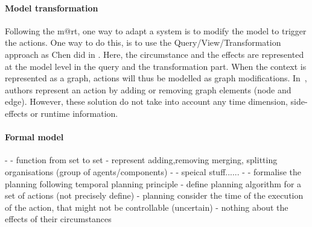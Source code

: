 	
\paragraph{Model transformation}
Following the \gls{m@rt}, one way to adapt a system is to modify the model to trigger the actions.
One way to do this, is to use the Query/View/Transformation~\cite{QVT:Spec} approach as Chen \etal did in \cite{DBLP:conf/icse/ChenPYNZ14}.
Here, the \gls{circumstance} and the effects are represented at the model level in the query and the transformation part.
When the context is represented as a graph, \glspl{action} will thus be modelled as graph modifications.
In~\cite{DBLP:journals/tse/KramerM90}, authors represent an action by adding or removing graph elements (node and edge).
However, these solution do not take into account any time dimension, side-effects or runtime information.
	
\paragraph{Formal model}
- \cite{DBLP:journals/taas/WeynsHH10}
	- function from set to set
	- represent adding,removing merging, splitting organisations (group of agents/components)
- \cite{DBLP:conf/icse/BartelsK11}
	- speical stuff......
- \cite{DBLP:conf/aaai/CimattiMR15} %
	- formalise the planning following temporal planning principle
	- define planning algorithm for a set of actions (not precisely define)
	- planning consider the time of the execution of the action, that might not be controllable (uncertain)
	- nothing about the effects of their circumstances
	
